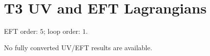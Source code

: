 \documentclass[10pt]{article}
\begin{document}
\section*{T3 UV and EFT Lagrangians}
EFT order: $5$; loop order: $1$.
\begin{landscape}
\footnotesize
No fully converted UV/EFT results are available.
\end{landscape}
\end{document}
